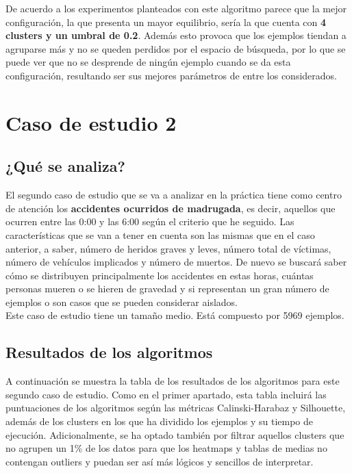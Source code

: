 	De acuerdo a los experimentos planteados con este algoritmo parece que la mejor configuración, la que presenta un mayor equilibrio, sería la que cuenta con \textbf{4 clusters y un umbral de 0.2}. Además esto provoca que los ejemplos tiendan a agruparse más y no se queden perdidos por el espacio de búsqueda, por lo que se puede ver que no se desprende de ningún ejemplo cuando se da esta configuración, resultando ser sus mejores parámetros de entre los considerados.
	
	\section{Caso de estudio 2}
	
	\subsection{¿Qué se analiza?}
	El segundo caso de estudio que se va a analizar en la práctica tiene como centro de atención los \textbf{accidentes ocurridos de madrugada}, es decir, aquellos que ocurren entre las 0:00 y las 6:00 según el criterio que he seguido. Las características que se van a tener en cuenta son las mismas que en el caso anterior, a saber, número de heridos graves y leves, número total de víctimas, número de vehículos implicados y número de muertos. De nuevo se buscará saber cómo se distribuyen principalmente los accidentes en estas horas, cuántas personas mueren o se hieren de gravedad y si representan un gran número de ejemplos o son casos que se pueden considerar aislados.\\
	
	Este caso de estudio tiene un tamaño medio. Está compuesto por 5969 ejemplos.
	
	\subsection{Resultados de los algoritmos}
	
	A continuación se muestra la tabla de los resultados de los algoritmos para este segundo caso de estudio. Como en el primer apartado, esta tabla incluirá las puntuaciones de los algoritmos según las métricas Calinski-Harabaz y Silhouette, además de los clusters en los que ha dividido los ejemplos y su tiempo de ejecución. Adicionalmente, se ha optado también por filtrar aquellos clusters que no agrupen un 1\% de los datos para que los heatmaps y tablas de medias no contengan outliers y puedan ser así más lógicos y sencillos de interpretar.
	

